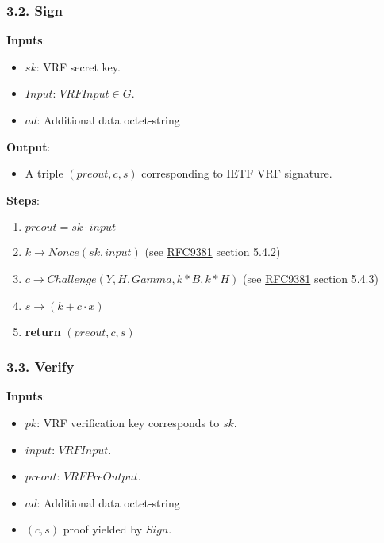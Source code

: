 \documentclass[
]{article}
\providecommand{\tightlist}{%
  \setlength{\itemsep}{0pt}\setlength{\parskip}{0pt}}
\begin{document}
\hypertarget{sign}{%
\subsubsection{3.2. Sign}\label{sign}}

\textbf{Inputs}:

\begin{itemize}
\tightlist
\item
  \(sk\): VRF secret key.
\item
  \(Input\): \(VRFInput \in G\).
\item
  \(ad\): Additional data octet-string
\end{itemize}

\textbf{Output}:

\begin{itemize}
\tightlist
\item
  A triple \((preout, c, s)\) corresponding to IETF VRF signature.
\end{itemize}

\textbf{Steps}:

\begin{enumerate}
\def\labelenumi{\arabic{enumi}.}
\tightlist
\item
  \(preout = sk \cdot input\)
\item
  \(k \rightarrow Nonce(sk, input)\) (see
  \href{https://datatracker.ietf.org/doc/rfc9381/}{RFC9381} section
  5.4.2)
\item
  \(c \rightarrow Challenge(Y, H, Gamma, k*B, k*H)\) (see
  \href{https://datatracker.ietf.org/doc/rfc9381/}{RFC9381} section
  5.4.3)
\item
  \(s \rightarrow (k + c \cdot x)\)
\item
  \textbf{return} \((preout, c, s)\)
\end{enumerate}

\hypertarget{verify}{%
\subsubsection{3.3. Verify}\label{verify}}

\textbf{Inputs}:

\begin{itemize}
\tightlist
\item
  \(pk\): VRF verification key corresponds to \(sk\).
\item
  \(input\): \(VRFInput\).
\item
  \(preout\): \(VRFPreOutput\).
\item
  \(ad\): Additional data octet-string
\item
  \((c, s)\) proof yielded by \(Sign\).
\end{itemize}
\end{document}

